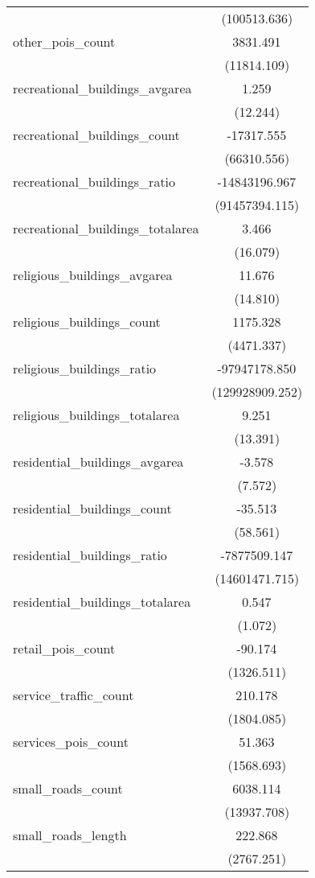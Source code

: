 \begin{table}[!htbp]
\begin{tabular}{@{\extracolsep{5pt}}lc}
  & (100513.636) \\
 other_pois_count & 3831.491$^{}$ \\
  & (11814.109) \\
 recreational_buildings_avgarea & 1.259$^{}$ \\
  & (12.244) \\
 recreational_buildings_count & -17317.555$^{}$ \\
  & (66310.556) \\
 recreational_buildings_ratio & -14843196.967$^{}$ \\
  & (91457394.115) \\
 recreational_buildings_totalarea & 3.466$^{}$ \\
  & (16.079) \\
 religious_buildings_avgarea & 11.676$^{}$ \\
  & (14.810) \\
 religious_buildings_count & 1175.328$^{}$ \\
  & (4471.337) \\
 religious_buildings_ratio & -97947178.850$^{}$ \\
  & (129928909.252) \\
 religious_buildings_totalarea & 9.251$^{}$ \\
  & (13.391) \\
 residential_buildings_avgarea & -3.578$^{}$ \\
  & (7.572) \\
 residential_buildings_count & -35.513$^{}$ \\
  & (58.561) \\
 residential_buildings_ratio & -7877509.147$^{}$ \\
  & (14601471.715) \\
 residential_buildings_totalarea & 0.547$^{}$ \\
  & (1.072) \\
 retail_pois_count & -90.174$^{}$ \\
  & (1326.511) \\
 service_traffic_count & 210.178$^{}$ \\
  & (1804.085) \\
 services_pois_count & 51.363$^{}$ \\
  & (1568.693) \\
 small_roads_count & 6038.114$^{}$ \\
  & (13937.708) \\
 small_roads_length & 222.868$^{}$ \\
  & (2767.251) \\

\end{tabular}
\end{table}
